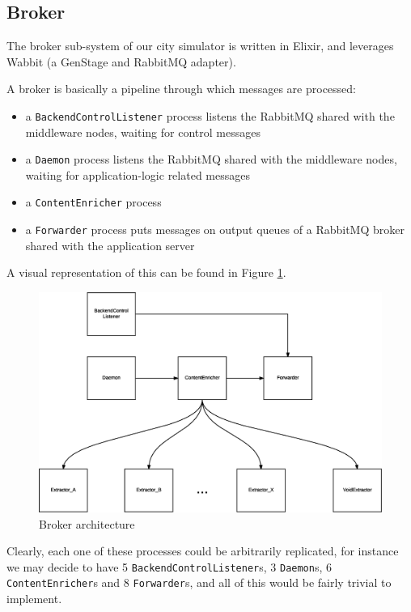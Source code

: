 \subsection{Broker}\label{sec:impl-broker}

The broker sub-system of our city simulator is written in Elixir, and leverages
Wabbit (a GenStage and RabbitMQ adapter).

A broker is basically a pipeline through which messages are processed:

\begin{itemize}
  \item a \texttt{BackendControlListener} process listens the RabbitMQ shared
    with the middleware nodes, waiting for control messages
  \item a \texttt{Daemon} process listens the RabbitMQ shared with the
    middleware nodes, waiting for application-logic related messages
  \item a \texttt{ContentEnricher} process 
  \item a \texttt{Forwarder} process puts messages on output queues of a
    RabbitMQ broker shared with the application server
\end{itemize}

A visual representation of this can be found in Figure \ref{fig:broker-arch}.

\begin{figure}[H]
  \centering
  \includegraphics[width=\columnwidth]{images/implementation/broker.eps}
  \caption{Broker architecture}
  \label{fig:broker-arch}
\end{figure}

Clearly, each one of these processes could be arbitrarily replicated, for
instance we may decide to have 5 \texttt{BackendControlListener}s, 3
\texttt{Daemon}s, 6 \texttt{ContentEnricher}s and 8 \texttt{Forwarder}s, and
all of this would be fairly trivial to implement.

